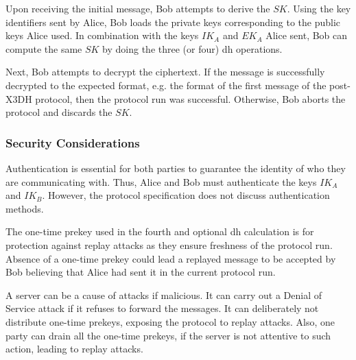 Upon receiving the initial message, Bob attempts to derive the $ SK $.
Using the key identifiers sent by Alice, Bob loads the private keys corresponding to the public keys Alice used. In combination with the keys $ IK_{A} $ and $ EK_{A} $ Alice sent, Bob can compute the same $ SK $ by doing the three (or four) \gls{dh} operations.
\par
Next, Bob attempts to decrypt the ciphertext. If the message is successfully decrypted to the expected format, e.g. the format of the first message of the post-X3DH protocol, then the protocol run was successful. Otherwise, Bob aborts the protocol and discards the $ SK $.

\subsubsection{Security Considerations}
Authentication is essential for both parties to guarantee the identity of who they are communicating with. Thus, Alice and Bob must authenticate the keys $ IK_{A} $ and $ IK_{B} $. However, the protocol specification does not discuss authentication methods.
\par
The one-time prekey used in the fourth and optional \gls{dh} calculation is for protection against replay attacks as they ensure freshness of the protocol run. Absence of a one-time prekey could lead a replayed message to be accepted by Bob believing that Alice had sent it in the current protocol run.
\par
A server can be a cause of attacks if malicious. It can carry out a Denial of Service attack if it refuses to forward the messages. It can deliberately not distribute one-time prekeys, exposing the protocol to replay attacks. Also, one party can drain all the one-time prekeys, if the server is not attentive to such action, leading to replay attacks.



%
